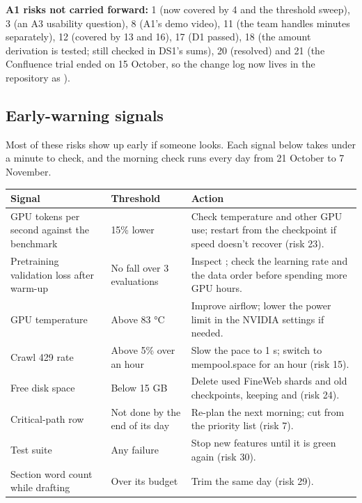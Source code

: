 \textbf{A1 risks not carried forward:} 1 (now covered by 4 and the threshold sweep), 3 (an A3
usability question), 8 (A1's demo video), 11 (the team handles minutes separately), 12 (covered by
13 and 16), 17 (D1 passed), 18 (the amount derivation is tested; still checked in DS1's sums), 20
(resolved) and 21 (the Confluence trial ended on 15 October, so the change log now lives in the
repository as ).

\subsection{Early-warning signals}

Most of these risks show up early if someone looks. Each signal below takes under a minute to
check, and the morning check runs every day from 21 October to 7 November.

\begin{center}
\small
\begin{tabularx}{\textwidth}{@{}L{3.9cm}L{3.6cm}Y@{}}
\toprule
\textbf{Signal} & \textbf{Threshold} & \textbf{Action} \\
\midrule
GPU tokens per second against the benchmark & 15\% lower & Check temperature and other GPU use; restart from the checkpoint if speed doesn't recover (risk 23). \\
Pretraining validation loss after warm-up & No fall over 3 evaluations & Inspect ; check the learning rate and the data order before spending more GPU hours. \\
GPU temperature & Above 83 °C & Improve airflow; lower the power limit in the NVIDIA settings if needed. \\
Crawl 429 rate & Above 5\% over an hour & Slow the pace to 1 s; switch to mempool.space for an hour (risk 15). \\
Free disk space & Below 15 GB & Delete used FineWeb shards and old checkpoints, keeping  and  (risk 24). \\
Critical-path row & Not done by the end of its day & Re-plan the next morning; cut from the priority list (risk 7). \\
Test suite & Any failure & Stop new features until it is green again (risk 30). \\
Section word count while drafting & Over its budget & Trim the same day (risk 29). \\
\bottomrule
\end{tabularx}
\end{center}

